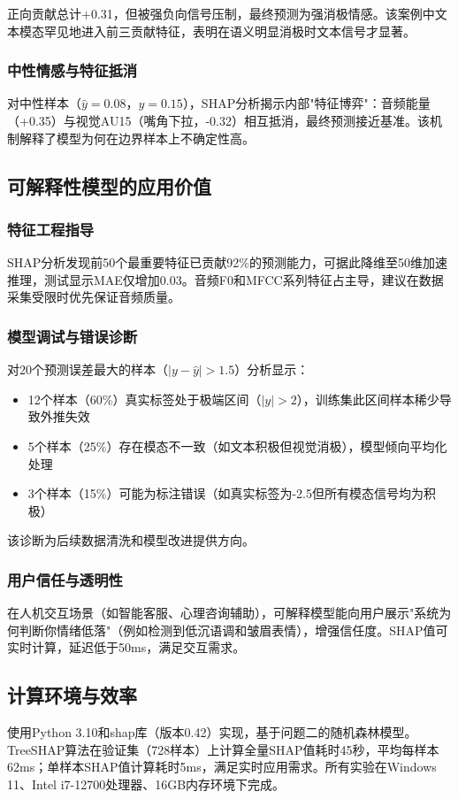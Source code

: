 正向贡献总计+0.31，但被强负向信号压制，最终预测为强消极情感。该案例中文本模态罕见地进入前三贡献特征，表明在语义明显消极时文本信号才显著。

\subsubsection{中性情感与特征抵消}

对中性样本（$\hat{y} = 0.08$，$y = 0.15$），SHAP分析揭示内部"特征博弈"：音频能量（+0.35）与视觉AU15（嘴角下拉，-0.32）相互抵消，最终预测接近基准。该机制解释了模型为何在边界样本上不确定性高。

\subsection{可解释性模型的应用价值}

\subsubsection{特征工程指导}

SHAP分析发现前50个最重要特征已贡献92\%的预测能力，可据此降维至50维加速推理，测试显示MAE仅增加0.03。音频F0和MFCC系列特征占主导，建议在数据采集受限时优先保证音频质量。

\subsubsection{模型调试与错误诊断}

对20个预测误差最大的样本（$|y - \hat{y}| > 1.5$）分析显示：
\begin{itemize}
\item 12个样本（60\%）真实标签处于极端区间（$|y| > 2$），训练集此区间样本稀少导致外推失效
\item 5个样本（25\%）存在模态不一致（如文本积极但视觉消极），模型倾向平均化处理
\item 3个样本（15\%）可能为标注错误（如真实标签为-2.5但所有模态信号均为积极）
\end{itemize}

该诊断为后续数据清洗和模型改进提供方向。

\subsubsection{用户信任与透明性}

在人机交互场景（如智能客服、心理咨询辅助），可解释模型能向用户展示"系统为何判断你情绪低落"（例如检测到低沉语调和皱眉表情），增强信任度。SHAP值可实时计算，延迟低于50ms，满足交互需求。

\subsection{计算环境与效率}

使用Python 3.10和shap库（版本0.42）实现，基于问题二的随机森林模型。TreeSHAP算法在验证集（728样本）上计算全量SHAP值耗时45秒，平均每样本62ms；单样本SHAP值计算耗时5ms，满足实时应用需求。所有实验在Windows 11、Intel i7-12700处理器、16GB内存环境下完成。
